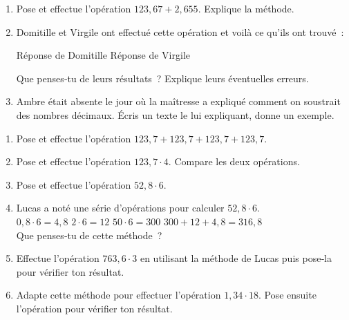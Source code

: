 
\begin{activite}

\begin{partie}
\begin{enumerate}
 \item Pose et effectue l'opération $123,67 + 2,655$. Explique la méthode.
 \item Domitille et Virgile ont effectué cette opération et voilà ce qu'ils ont trouvé :
 
 \hfill Réponse de Domitille \hfill Réponse de Virgile \hfill \phantom{.}
 
 Que penses‑tu de leurs résultats ? Explique leurs éventuelles erreurs.
 \item Ambre était absente le jour où la maîtresse a expliqué comment on soustrait des nombres décimaux. Écris un texte le lui expliquant, donne un exemple.
 \end{enumerate}
\end{partie}

\begin{partie}
\begin{enumerate}
 \item Pose et effectue l'opération $123,7 + 123,7 + 123,7 + 123,7$.
 \item Pose et effectue l'opération $123,7 \cdot 4$. Compare les deux opérations.
 \item Pose et effectue l'opération $52,8 \cdot 6$.
 \item Lucas a noté une série d'opérations pour calculer $52,8 \cdot 6$. \\[-1em]
 
 $0,8 \cdot 6 = 4,8$ \hfill $2 \cdot 6 = 12$ \hfill $50 \cdot 6 = 300$ \hfill $300 + 12 + 4,8 = 316,8$ \\[-1em]
 
 Que penses‑tu de cette méthode ?
 \item Effectue l'opération $763,6 \cdot 3$ en utilisant la méthode de Lucas puis pose‑la pour vérifier ton résultat.
 \item Adapte cette méthode pour effectuer l'opération $1,34 \cdot 18$. Pose ensuite l'opération pour vérifier ton résultat.
 \end{enumerate}
\end{partie}

\end{activite}



